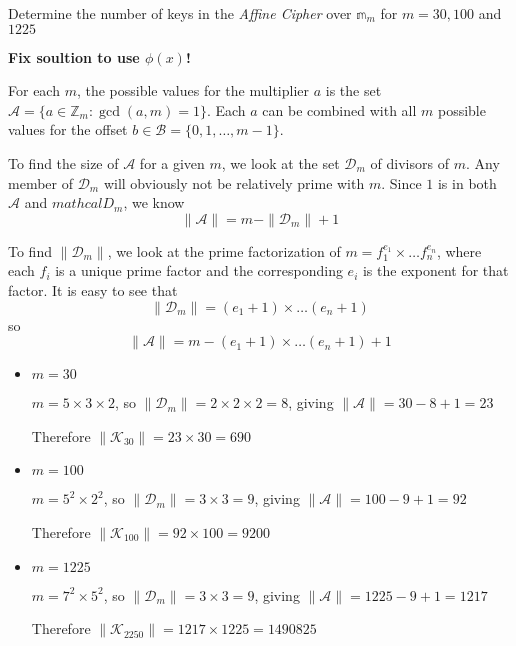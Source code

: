 \begin{statement}{1.7}
Determine the number of keys in the \textsl{Affine Cipher} over $\mathbb{m}_m$ for $m = 30, 100$ and $1225$
\end{statement}
\begin{center}
  \textbf{Fix soultion to use $\phi(x)$!}
  \end{center}


For each $m$, the possible values for the multiplier $a$ is the set $\mathcal{A} = \{a \in \mathbb{Z}_m : \gcd (a,m) = 1\}$. Each $a$ can be combined with all $m$ possible values for the offset $b \in \mathcal{B} = \{0,1,\ldots,m-1\}$.

To find the size of $\mathcal{A}$ for a given $m$, we look at the set
$\mathcal{D}_m$ of divisors of $m$. Any member of $\mathcal{D}_m$ will
obviously not be relatively prime with $m$. Since $1$ is in both
$\mathcal{A}$ and $mathcal{D}_m$, we know
\begin{equation*}
  \| \mathcal{A} \| = m - \| \mathcal{D}_m \| + 1
\end{equation*}

To find $\| \mathcal{D}_m \|$, we look at the prime factorization of $m
= f_1^{e_1} \times \ldots f_n^{e_n}$, where each $f_i$ is a unique
prime factor and the corresponding $e_i$ is the exponent for that
factor. It is easy to see that
\begin{equation*}
  \| \mathcal{D}_m \| = (e_1 + 1) \times \ldots (e_n + 1)
\end{equation*}
so
\begin{equation*}
  \| \mathcal{A} \| = m - (e_1 + 1) \times \ldots (e_n + 1) + 1
\end{equation*}


\begin{itemize}
\item $m=30$

  $m = 5 \times 3 \times 2$, so $\| \mathcal{D}_m \| = 2 \times 2 \times 2 = 8$, giving $\| \mathcal{A} \| = 30 - 8 + 1 = 23$

  Therefore $\| \mathcal{K}_{30} \| = 23 \times 30 = 690$

\item $m=100$

  $m = 5^2 \times 2^2$, so $\| \mathcal{D}_m \| = 3 \times 3 = 9$, giving $\| \mathcal{A} \| = 100 - 9 + 1 = 92$

  Therefore $\| \mathcal{K}_{100} \| = 92 \times 100 = 9200$
  
\item $m=1225$

  $m = 7^2 \times 5^2$, so $\| \mathcal{D}_m \| = 3 \times 3 = 9$, giving $\| \mathcal{A} \| = 1225 - 9 + 1 = 1217$

    Therefore $\| \mathcal{K}_{2250} \| = 1217 \times 1225 = 1490825$
\end{itemize}
